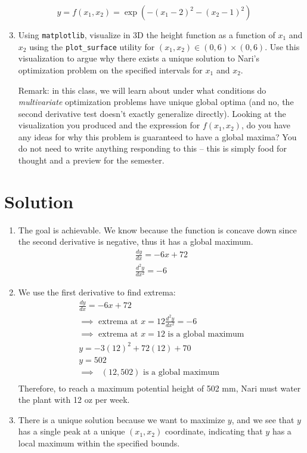 \documentclass{harvardml}
\theoremstyle{definition}
\theoremstyle{plain}
\newenvironment{solution}
  {\color{blue}\section*{Solution}}
{}
\begin{document}
\begin{problem}
$$y = f(x_1, x_2) = \exp\left(-(x_1 - 2)^2 - (x_2 - 1)^2 \right)$$
\begin{enumerate}
    \setcounter{enumi}{2}
    \item Using \texttt{matplotlib}, visualize in 3D the height function as a function of $x_1$ and $x_2$ using the \texttt{plot\_surface} utility for $(x_1, x_2) \in (0, 6) \times (0, 6)$. Use this visualization to argue why there exists a unique solution to Nari's optimization problem on the specified intervals for $x_1$ and $x_2$.

    Remark: in this class, we will learn about under what conditions do \textit{multivariate} optimization problems have unique global optima (and no, the second derivative test doesn't exactly generalize directly). Looking at the visualization you produced and the expression for $f(x_1, x_2)$, do you have any ideas for why this problem is guaranteed to have a global maxima? You do not need to write anything responding to this -- this is simply food for thought and a preview for the semester.
\end{enumerate}
\end{problem}

\newpage


\begin{solution}
	\begin{enumerate}
        \item The goal is achievable. We know because the function is concave down since the second derivative is negative, thus it has a global maximum.
        \begin{align*}
            \frac{dy}{dx} = -6x + 72\\
            \frac{d^2y}{dx^2} = -6
        \end{align*}
        \item We use the first derivative to find extrema:
        \begin{align*}
            \frac{dy}{dx} = -6x + 72\\
            \text{$\implies$ extrema at $x = 12$}
            \frac{d^2y}{dx^2} = -6\\
            \text{$\implies$ extrema at $x = 12$ is a global maximum}\\
            y = -3(12)^2 + 72(12) + 70\\
            y = 502\\
            \text{$\implies$ $(12,502)$ is a global maximum}\\
        \end{align*}
        Therefore, to reach a maximum potential height of 502 mm, Nari must water the plant with 12 oz per week.
        \item There is a unique solution because we want to maximize $y$, and we see that $y$ has a single peak at a unique $(x_1, x_2)$ coordinate, indicating that $y$ has a local maximum within the specified bounds.
    \end{enumerate}
\end{solution}
\end{document}
